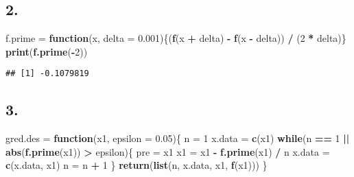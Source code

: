 \documentclass[]{article}
\newenvironment{Shaded}{\begin{snugshade}}{\end{snugshade}}
\newcommand{\KeywordTok}[1]{\textcolor[rgb]{0.13,0.29,0.53}{\textbf{#1}}}
\newcommand{\DataTypeTok}[1]{\textcolor[rgb]{0.13,0.29,0.53}{#1}}
\newcommand{\DecValTok}[1]{\textcolor[rgb]{0.00,0.00,0.81}{#1}}
\newcommand{\FloatTok}[1]{\textcolor[rgb]{0.00,0.00,0.81}{#1}}
\newcommand{\StringTok}[1]{\textcolor[rgb]{0.31,0.60,0.02}{#1}}
\newcommand{\ControlFlowTok}[1]{\textcolor[rgb]{0.13,0.29,0.53}{\textbf{#1}}}
\newcommand{\OperatorTok}[1]{\textcolor[rgb]{0.81,0.36,0.00}{\textbf{#1}}}
\newcommand{\NormalTok}[1]{#1}
\begin{document}
\subsection{2.}\label{section-7}

\begin{Shaded}
\begin{Highlighting}[]
\NormalTok{f.prime =}\StringTok{ }\ControlFlowTok{function}\NormalTok{(x, }\DataTypeTok{delta =} \FloatTok{0.001}\NormalTok{)\{(}\KeywordTok{f}\NormalTok{(x }\OperatorTok{+}\StringTok{ }\NormalTok{delta) }\OperatorTok{-}\StringTok{ }\KeywordTok{f}\NormalTok{(x }\OperatorTok{-}\StringTok{ }\NormalTok{delta)) }\OperatorTok{/}\StringTok{ }\NormalTok{(}\DecValTok{2} \OperatorTok{*}\StringTok{ }\NormalTok{delta)\}}
\KeywordTok{print}\NormalTok{(}\KeywordTok{f.prime}\NormalTok{(}\OperatorTok{-}\DecValTok{2}\NormalTok{))}
\end{Highlighting}
\end{Shaded}

\begin{verbatim}
## [1] -0.1079819
\end{verbatim}

\subsection{3.}\label{section-8}

\begin{Shaded}
\begin{Highlighting}[]
\NormalTok{gred.des =}\StringTok{ }\ControlFlowTok{function}\NormalTok{(x1, }\DataTypeTok{epsilon =} \FloatTok{0.05}\NormalTok{)\{}
\NormalTok{    n =}\StringTok{ }\DecValTok{1}
\NormalTok{    x.data =}\StringTok{ }\KeywordTok{c}\NormalTok{(x1)}
    \ControlFlowTok{while}\NormalTok{(n }\OperatorTok{==}\StringTok{ }\DecValTok{1} \OperatorTok{||}\StringTok{ }\KeywordTok{abs}\NormalTok{(}\KeywordTok{f.prime}\NormalTok{(x1)) }\OperatorTok{>}\StringTok{ }\NormalTok{epsilon)\{}
\NormalTok{        pre =}\StringTok{ }\NormalTok{x1}
\NormalTok{        x1 =}\StringTok{ }\NormalTok{x1 }\OperatorTok{-}\StringTok{ }\KeywordTok{f.prime}\NormalTok{(x1) }\OperatorTok{/}\StringTok{ }\NormalTok{n}
\NormalTok{        x.data =}\StringTok{ }\KeywordTok{c}\NormalTok{(x.data, x1)}
\NormalTok{        n =}\StringTok{ }\NormalTok{n }\OperatorTok{+}\StringTok{ }\DecValTok{1}
\NormalTok{    \}}
    \KeywordTok{return}\NormalTok{(}\KeywordTok{list}\NormalTok{(n, x.data, x1, }\KeywordTok{f}\NormalTok{(x1)))}
\NormalTok{\}}
\end{Highlighting}
\end{Shaded}
\end{document}
